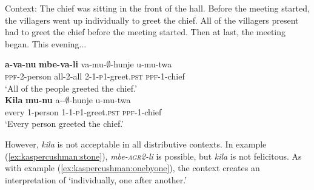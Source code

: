 \documentclass[output=paper,modfonts,nonflat]{langsci/langscibook}
\begin{document}
\begin{exe}

\ex Context: The chief was sitting in the front of the hall.  Before the meeting started, the villagers went up individually to greet the chief. All of the villagers present had to greet the chief before the meeting started. Then at last, the meeting began. This evening... \label{ex:kaspercushman:didgreet}

\begin{xlist}

\ex 
\gll \textbf{a-va-nu} \textbf{mbe-va-li} va-mu-$\emptyset$-hunje u-mu-twa \\
\textsc{ppf}-2-person all-2-all 2-1-\textsc{p1}-greet.\textsc{pst} \textsc{ppf}-1-chief \\
\glt `All of the people greeted the chief.' \\



\ex 
\gll \textbf{Kila} \textbf{mu-nu} a--$\emptyset$-hunje u-mu-twa \\
every 1-person 1-1-\textsc{p1}-greet.\textsc{pst} \textsc{ppf}-1-chief  \\ \label{ex:kaspercushman:everygreeted}
\glt `Every person greeted the chief.' 

\end{xlist}
\end{exe}


However, \textit{kila} is not acceptable in all distributive contexts. In example (\ref{ex:kaspercushman:stone}), \textit{mbe-\textsc{agr2}-li} is possible, but \textit{kila} is not felicitous. As with example (\ref{ex:kaspercushman:onebyone}), the context creates an interpretation of `individually, one after another.'  
\end{document}
